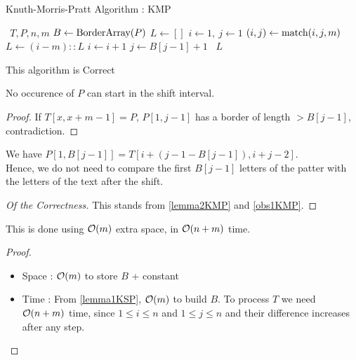 \documentclass{cours}
\begin{document}
\begin{algorithm}
    \caption{Knuth-Morris-Pratt Algorithm : KMP}
    \begin{algorithmic}
        \Input $\ \ T, P, n, m$
        \EndInput
        \State $B \gets \textmd{BorderArray}(P)$
        \State $L \gets []$
        \State $i \gets 1, \ j\gets 1$
            \State $(i, j) \gets \textmd{match}(i, j, m)$
                \State $L \gets (i - m)::L$
            \Else 
                    \State $i \gets i + 1$
                \Else 
                    \State $j \gets B[j - 1] + 1$
                \EndIf
            \EndIf
        \EndWhile
        \Return \ $L$
    \end{algorithmic}
\end{algorithm}

\begin{proposition}
    This algorithm is Correct
\end{proposition}
\begin{lemma}\label{lemma2KMP}
    No occurence of $P$ can start in the shift interval.
\end{lemma}
\begin{proof}
    If $T[x, x + m - 1] = P$, $P[1, j - 1]$ has a border of length $> B[j - 1]$, contradiction.
\end{proof}

\begin{lemma}\label{obs1KMP}
    We have $ P[1, B[j-1]] = T[i + (j - 1 - B[j-1]), i + j - 2]$. \\
    Hence, we do not need to compare the first $B[j - 1]$ letters of the patter with the letters of the text after the shift.
\end{lemma}
\begin{proof}[Of the Correctness]
    This stands from \ref{lemma2KMP} and \ref{obs1KMP}.
\end{proof}

\begin{proposition}
    This is done using $\mathcal{O}(m)$ extra space, in $\mathcal{O}(n + m)$ time.
\end{proposition}
\begin{proof}
    \begin{itemize}
        \item Space : $\mathcal{O}(m)$ to store $B$ + constant
        \item Time : From \ref{lemma1KSP}, $\mathcal{O}(m)$ to build $B$. To process $T$ we need $\mathcal{O}(n + m)$ time, since $1 \leq i \leq n$ and $1 \leq j \leq n$ and their difference increases after any step.
    \end{itemize}
\end{proof}
\end{document}
